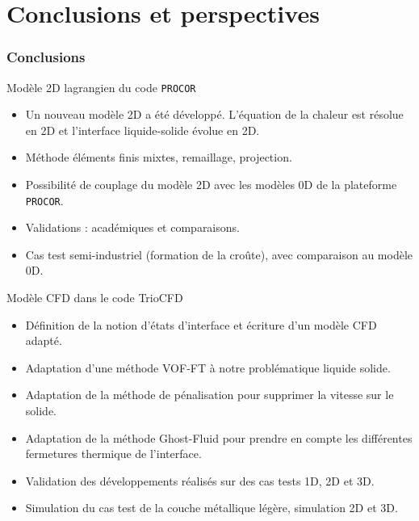 \documentclass{beamer}
\newcommand{\procor}{\texttt{PROCOR}}
\begin{document}
\section{Conclusions et perspectives}

\begin{frame}
    \frametitle{Conclusions}
    \scriptsize
    \begin{ceablock}{Modèle 2D lagrangien du code \procor}
        \begin{itemize}
            \item Un nouveau modèle 2D a été développé. L'équation de la chaleur est résolue en 2D et l'interface liquide-solide évolue en 2D.
            \item Méthode éléments finis mixtes, remaillage, projection.
            \item Possibilité de couplage du modèle 2D avec les modèles 0D de la plateforme \procor{}.
            \item Validations : académiques et comparaisons.
            \item Cas test semi-industriel (formation de la croûte), avec comparaison au modèle 0D.
        \end{itemize}
    \end{ceablock}
    
     \begin{ceablock}{Modèle CFD dans le code TrioCFD}
        \begin{itemize}
        	\item Définition de la notion d'états d'interface et écriture d'un modèle CFD  adapté.
            \item Adaptation d'une méthode VOF-FT à notre problématique liquide solide.
            \item Adaptation de la méthode de pénalisation pour supprimer la vitesse sur le solide.
            \item Adaptation de la méthode Ghost-Fluid pour prendre en compte les différentes fermetures thermique de l'interface.
            \item Validation des développements réalisés sur des cas tests 1D, 2D et 3D.
            \item Simulation du cas test de la  couche métallique légère, simulation 2D et 3D.
        \end{itemize}
    \end{ceablock}

\end{frame}
\end{document}
